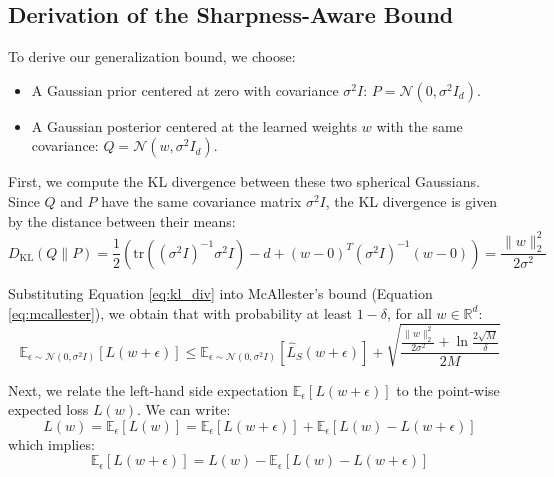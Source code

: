 \documentclass{article}
\theoremstyle{plain}
\theoremstyle{definition}
\theoremstyle{remark}
\begin{document}
\subsection{Derivation of the Sharpness-Aware Bound}
To derive our generalization bound, we choose:
\begin{itemize}
    \item A Gaussian prior centered at zero with covariance $\sigma^2 I$: $P = \mathcal{N}(0, \sigma^2 I_d)$.
    \item A Gaussian posterior centered at the learned weights $w$ with the same covariance: $Q = \mathcal{N}(w, \sigma^2 I_d)$.
\end{itemize}

First, we compute the KL divergence between these two spherical Gaussians. Since $Q$ and $P$ have the same covariance matrix $\sigma^2 I$, the KL divergence is given by the distance between their means:
\begin{equation}
\label{eq:kl_div}
    D_{\text{KL}}(Q \parallel P) = \frac{1}{2} \left( \text{tr}((\sigma^2 I)^{-1} \sigma^2 I) - d + (w - 0)^T (\sigma^2 I)^{-1} (w - 0) \right) = \frac{\|w\|_2^2}{2\sigma^2}
\end{equation}

Substituting Equation \eqref{eq:kl_div} into McAllester's bound (Equation \eqref{eq:mcallester}), we obtain that with probability at least $1 - \delta$, for all $w \in \mathbb{R}^d$:
\begin{equation}
\label{eq:substituted_bound}
    \mathbb{E}_{\epsilon \sim \mathcal{N}(0, \sigma^2 I)} [L(w + \epsilon)] \le \mathbb{E}_{\epsilon \sim \mathcal{N}(0, \sigma^2 I)} [\widehat{L}_S(w + \epsilon)] + \sqrt{\frac{\frac{\|w\|_2^2}{2\sigma^2} + \ln \frac{2\sqrt{M}}{\delta}}{2M}}
\end{equation}

Next, we relate the left-hand side expectation $\mathbb{E}_{\epsilon} [L(w + \epsilon)]$ to the point-wise expected loss $L(w)$. We can write:
\begin{equation}
    L(w) = \mathbb{E}_{\epsilon} [L(w)] = \mathbb{E}_{\epsilon} [L(w + \epsilon)] + \mathbb{E}_{\epsilon} [L(w) - L(w + \epsilon)]
\end{equation}
which implies:
\begin{equation}
\label{eq:lhs_relation}
    \mathbb{E}_{\epsilon} [L(w + \epsilon)] = L(w) - \mathbb{E}_{\epsilon} [L(w) - L(w + \epsilon)]
\end{equation}
\end{document}
